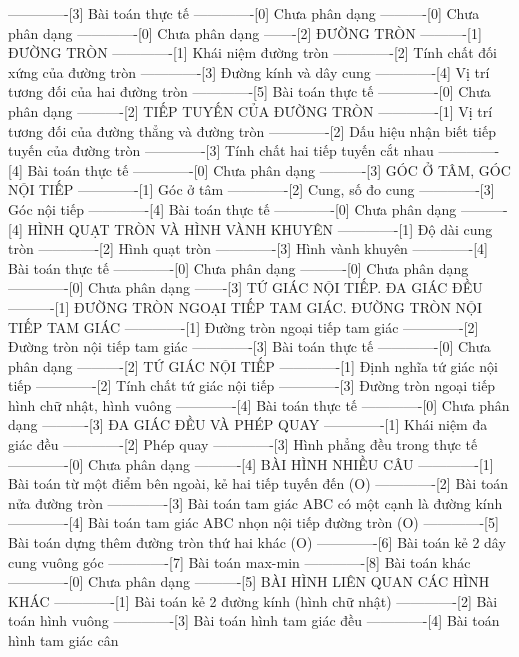 -------------[3] Bài toán thực tế
-------------[0] Chưa phân dạng
----------[0] Chưa phân dạng
-------------[0] Chưa phân dạng
-------[2] ĐƯỜNG TRÒN
----------[1] ĐƯỜNG TRÒN
-------------[1] Khái niệm đường tròn
-------------[2] Tính chất đối xứng của đường tròn
-------------[3] Đường kính và dây cung
-------------[4] Vị trí tương đối của hai đường tròn
-------------[5] Bài toán thực tế
-------------[0] Chưa phân dạng
----------[2] TIẾP TUYẾN CỦA ĐƯỜNG TRÒN
-------------[1] Vị trí tương đối của đường thẳng và đường tròn
-------------[2] Dấu hiệu nhận biết tiếp tuyến của đường tròn
-------------[3] Tính chất hai tiếp tuyến cắt nhau
-------------[4] Bài toán thực tế
-------------[0] Chưa phân dạng
----------[3] GÓC Ở TÂM, GÓC NỘI TIẾP
-------------[1] Góc ở tâm
-------------[2] Cung, số đo cung
-------------[3] Góc nội tiếp
-------------[4] Bài toán thực tế
-------------[0] Chưa phân dạng
----------[4] HÌNH QUẠT TRÒN VÀ HÌNH VÀNH KHUYÊN
-------------[1] Độ dài cung tròn
-------------[2] Hình quạt tròn
-------------[3] Hình vành khuyên
-------------[4] Bài toán thực tế
-------------[0] Chưa phân dạng
----------[0] Chưa phân dạng
-------------[0] Chưa phân dạng
-------[3] TỨ GIÁC NỘI TIẾP. ĐA GIÁC ĐỀU
----------[1] ĐƯỜNG TRÒN NGOẠI TIẾP TAM GIÁC. ĐƯỜNG TRÒN NỘI TIẾP TAM GIÁC
-------------[1] Đường tròn ngoại tiếp tam giác
-------------[2] Đường tròn nội tiếp tam giác
-------------[3] Bài toán thực tế
-------------[0] Chưa phân dạng
----------[2] TỨ GIÁC NỘI TIẾP
-------------[1] Định nghĩa tứ giác nội tiếp
-------------[2] Tính chất tứ giác nội tiếp
-------------[3] Đường tròn ngoại tiếp hình chữ nhật, hình vuông
-------------[4] Bài toán thực tế
-------------[0] Chưa phân dạng
----------[3] ĐA GIÁC ĐỀU VÀ PHÉP QUAY
-------------[1] Khái niệm đa giác đều
-------------[2] Phép quay
-------------[3] Hình phẳng đều trong thực tế
-------------[0] Chưa phân dạng
----------[4] BÀI HÌNH NHIỀU CÂU
-------------[1] Bài toán từ một điểm bên ngoài, kẻ hai tiếp tuyến đến (O)
-------------[2] Bài toán nửa đường tròn
-------------[3] Bài toán tam giác ABC có một cạnh là đường kính
-------------[4] Bài toán tam giác ABC nhọn nội tiếp đường tròn (O)
-------------[5] Bài toán dựng thêm đường tròn thứ hai khác (O)
-------------[6] Bài toán kẻ 2 dây cung vuông góc
-------------[7] Bài toán max-min
-------------[8] Bài toán khác
-------------[0] Chưa phân dạng
----------[5] BÀI HÌNH LIÊN QUAN CÁC HÌNH KHÁC
-------------[1] Bài toán kẻ 2 đường kính (hình chữ nhật)
-------------[2] Bài toán hình vuông
-------------[3] Bài toán hình tam giác đều
-------------[4] Bài toán hình tam giác cân
